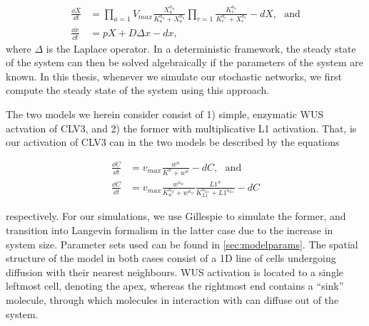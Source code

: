 \begin{align}
  \frac{\dd X}{\dd t} &= 
  \prod_{a=1} V_{max}\frac{X_a^{n_{a}}}{K_a^{n_a} + X_a^{n_a}}
  \prod_{r=1} \frac{K_r^{n_{r}}}{K_r^{n_r} + X_r^{n_r}} -
  dX, \ \ \ \text{and} \\
  \frac{\dd x}{\dd t} &= pX + D\Delta x - dx,
  \label{eq:gene_expr_reg}
\end{align}
where $\Delta$ is the Laplace operator. In a deterministic framework, the steady
state of the system can then be solved algebraically if the
parameters of the system are known. In this thesis, whenever we simulate our
stochastic networks, we first compute the steady state of the system using this approach.

The two models we herein consider consist of 1) simple, enzymatic WUS actvation
of CLV3, and 2) the former with multiplicative L1 activation. That, is our
activation of CLV3 can in the two models be described by the equations 

\begin{align}
  \frac{\dd C}{\dd t} &= v_{max} \frac{w^n}{K^n + w^n} - dC, \ \ \
  \text{and} \\
  \frac{\dd C}{\dd t} &= v_{max} 
  \frac{w^{n_{w}}}{K_{w}^{n_{w}} + w^{n_{w}}} 
   \frac{L1^n}{K_{L1}^{n_{L1}} + L1^{n_{L1}}} - dC
  \label{eq:model_eqs}
\end{align}

respectively. For our simulations, we use Gillespie to simulate the former, and
transition into Langevin formalism in the latter case due to the increase in
system size. Parameter sets used can be found in \cref{sec:modelparams}. The
spatial structure of the model in both cases consist of a 1D line of cells
undergoing diffusion with their nearest neighbours. WUS activation is located to
a single leftmost cell, denoting the apex, whereas the rightmost end contains a
``sink'' molecule, through which molecules in interaction with can diffuse out of
the system.


